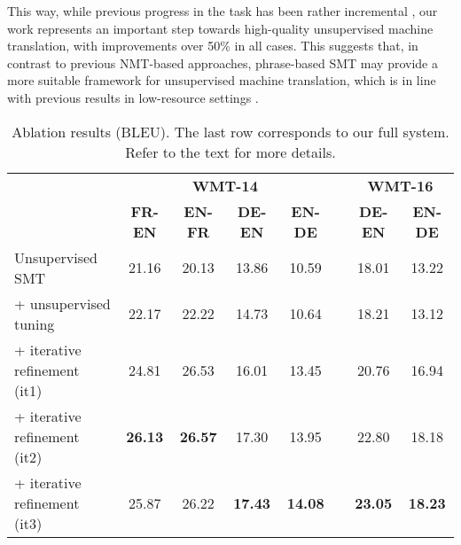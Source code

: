 \documentclass[11pt,a4paper]{article}
\begin{document}
This way, while previous progress in the task has been rather incremental \citep{yang2018unsupervised}, our work represents an important step towards high-quality unsupervised machine translation, with improvements over 50\% in all cases. This suggests that, in contrast to previous NMT-based approaches, phrase-based SMT may provide a more suitable framework for unsupervised machine translation, which is in line with previous results in low-resource settings \citep{koehn2017six}.

\begin{table*}[t]
\begin{center}
  \begin{tabular}{lccccccc}
    \toprule
    & \multicolumn{4}{c}{\bf WMT-14} & & \multicolumn{2}{c}{\bf WMT-16} \\
    \cmidrule{2-5} \cmidrule{7-8}
    & \multicolumn{1}{c}{\bf FR-EN} & \multicolumn{1}{c}{\bf EN-FR} & \multicolumn{1}{c}{\bf DE-EN} & \multicolumn{1}{c}{\bf EN-DE} & & \multicolumn{1}{c}{\bf DE-EN} & \multicolumn{1}{c}{\bf EN-DE} \\
    \midrule
    Unsupervised SMT & 21.16 & 20.13 & 13.86 & 10.59 & & 18.01 & 13.22 \\
    + unsupervised tuning & 22.17 & 22.22 & 14.73 & 10.64 & & 18.21 & 13.12 \\
    + iterative refinement (it1) & 24.81 & 26.53 & 16.01 & 13.45 & & 20.76 & 16.94 \\
    + iterative refinement (it2) & \bf 26.13 & \bf 26.57 & 17.30 & 13.95 & & 22.80 & 18.18 \\
    + iterative refinement (it3) & 25.87 & 26.22 & \bf 17.43 & \bf 14.08 & & \bf 23.05 & \bf 18.23 \\
    \bottomrule
  \end{tabular}
\end{center}
\caption{Ablation results (BLEU). The last row corresponds to our full system. Refer to the text for more details.}
\label{tab:results_ablation}
\end{table*}
\end{document}
